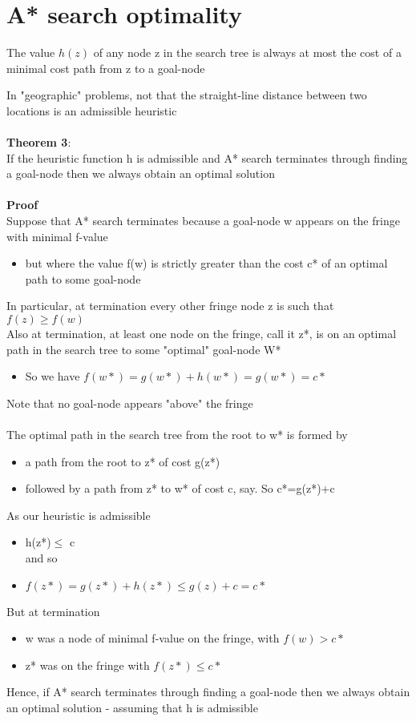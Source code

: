 \documentclass{article}[18pt]
\begin{document}
\section{A* search optimality}
\begin{defin}
The value $h(z)$ of any node z in the search tree is always at most the cost of a minimal cost path from z to a goal-node
\end{defin}
In "geographic" problems, not that the straight-line distance between two locations is an admissible heuristic\\
\\
\textbf{Theorem 3}:\\
If the heuristic function h is admissible and A* search terminates through finding a goal-node then we always obtain an optimal solution\\
\\
\textbf{Proof}\\
Suppose that A* search terminates because a goal-node w appears on the fringe with minimal f-value
\begin{itemize}
	\item but where the value f(w) is strictly greater than the cost c* of an optimal path to some goal-node
\end{itemize}
In particular, at termination every other fringe node z is such that $f(z)\geqslant f(w)$\\
Also at termination, at least one node on the fringe, call it z*, is on an optimal path in the search tree to some "optimal" goal-node W*
\begin{itemize}
	\item So we have $f(w*)=g(w*)+h(w*)=g(w*)=c*$
\end{itemize}
Note that no goal-node appears "above" the fringe\\
\\
The optimal path in the search tree from the root to w* is formed by
\begin{itemize}
	\item a path from the root to z* of cost g(z*)
	\item followed by a path from z* to w* of cost c, say. So c*=g(z*)+c
\end{itemize}
As our heuristic is admissible
\begin{itemize}
	\item h(z*)$\leqslant$ c\\
	and so
	\item $f(z*)=g(z*)+h(z*)\leqslant g(z) +c =c*$
\end{itemize}
But at termination
\begin{itemize}
	\item w was a node of minimal f-value on the fringe, with $f(w)>c*$
	\item z* was on the fringe with $f(z*)\leqslant c*$
\end{itemize}
Hence, if A* search terminates through finding a goal-node then we always obtain an optimal solution - assuming that h is admissible
\end{document}
